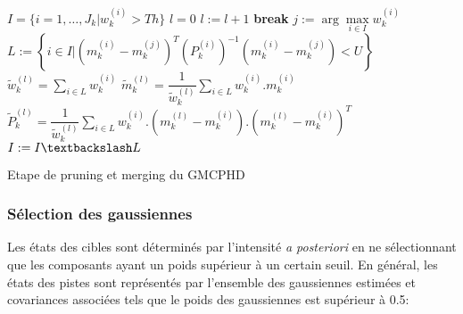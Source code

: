 \documentclass[10pt,french,a4paper]{report}
\begin{document}
 \begin{algorithm}

 \begin{algorithmic} 
  \STATE $I=\{i=1,\ldots,J_k|w_k^{(i)}>Th\}$
  \STATE $l=0$
\REPEAT
\STATE $l:=l+1$
\STATE \textbf{break}
\ENDIF
\STATE $j:=\arg\max\limits_{i\in I}w_k^{(i)}$ 
\STATE $L:=\left\{i\in I|(m_k^{(i)}-m_k^{(j)})^T(P_k^{(i)})^{-1}(m_k^{(i)}-m_k^{(j)})<U\right\}$
\STATE $\tilde{w}_k^{(l)}=\sum\limits_{i\in L} w_k^{(i)}$
\STATE $\tilde{m}_k^{(l)}=\dfrac{1}{\tilde{w}_k^{(l)}}\sum\limits_{i\in L} w_k^{(i)}.m_k^{(i)}$
\STATE $\tilde{P}_k^{(l)}=\dfrac{1}{\tilde{w}_k^{(l)}}\sum\limits_{i\in L}w_k^{(i)}.(m_k^{(l)}-m_k^{(i)}).(m_k^{(l)}-m_k^{(i)})^T$
\STATE $I:=I\textbackslash L$
 \end{algorithmic}
 \caption{Etape de pruning et merging du GMCPHD}
 \label{alg1}
\end{algorithm}
 

\subsubsection{Sélection des gaussiennes}
\label{SelectionGausiennes}
	Les états des cibles sont déterminés par l'intensité \textit{a posteriori} en ne sélectionnant que les composants ayant un poids supérieur à un certain seuil. En général, les états des pistes sont représentés par l'ensemble des gaussiennes estimées et covariances associées tels que le poids des gaussiennes est supérieur à 0.5:
	
\end{document}
